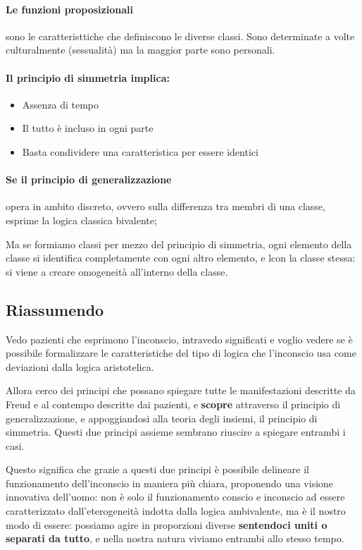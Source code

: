 \documentclass[12pt, a4paper]{article}
\begin{document}
\paragraph{Le funzioni proposizionali}  sono le caratteristtiche che definiscono le diverse classi. Sono determinate a volte culturalmente (sessualità) ma la maggior parte sono personali.

\paragraph{Il principio di simmetria implica:}  

\begin{itemize}
    \item Assenza di tempo
    \item Il tutto è incluso in ogni parte
    \item Basta condividere una caratteristica per essere identici
\end{itemize}

\paragraph{Se il principio di generalizzazione}  opera in ambito discreto, ovvero sulla differenza tra membri di una classe, esprime la logica classica bivalente;

Ma se formiamo classi per mezzo del principio di simmetria, ogni elemento della classe si identifica completamente con ogni altro elemento, e lcon la classe stessa: si viene a creare omogeneità all'interno della classe.

\subsection{Riassumendo}

Vedo pazienti che esprimono l'inconscio, intravedo significati e voglio vedere se è possibile formalizzare le caratteristiche del tipo di logica che l'inconscio usa come deviazioni dalla logica aristotelica.

Allora cerco dei principi che possano spiegare tutte le manifestazioni descritte da Freud e al contempo descritte dai pazienti, e \textbf{scopre} attraverso il principio di generalizzazione, e appoggiandosi alla teoria degli insiemi, il principio di simmetria. Questi due principi assieme sembrano riuscire a spiegare entrambi i casi.

Questo significa che grazie a questi due principi è possibile delineare il funzionamento dell'inconscio in maniera più chiara, proponendo una visione innovativa dell'uomo: non è solo il funzionamento conscio e inconscio ad essere caratterizzato dall'eterogeneità indotta dalla logica ambivalente, ma è il nostro modo di essere: possiamo agire in proporzioni diverse \textbf{sentendoci uniti o separati da tutto}, e nella nostra natura viviamo entrambi allo stesso tempo.
\end{document}

